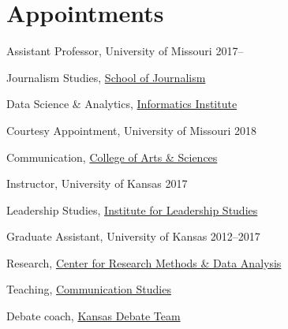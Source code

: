 
\section{Appointments}

Assistant Professor, University of Missouri                    \hfill 2017--

  \begin{outerlist}
    \item[] Journalism Studies, \href{http://journalism.missouri.edu/}{School of Journalism}
    \item[] Data Science \& Analytics, \href{https://muii.missouri.edu/}{Informatics Institute}
  \end{outerlist}\vspace{.2in}

Courtesy Appointment, University of Missouri                   \hfill 2018

  \begin{outerlist}
    \item[] Communication, \href{https://communication.missouri.edu/}{College of Arts \& Sciences}
  \end{outerlist}\vspace{.2in}


Instructor, University of Kansas                               \hfill 2017

  \begin{outerlist}
    \item[] Leadership Studies, \href{https://ils.ku.edu/about/}{Institute for Leadership Studies}
  \end{outerlist}\vspace{.2in}

Graduate Assistant, University of Kansas                       \hfill 2012--2017

  \begin{outerlist}
    \item[] Research, \href{http://www.crmda.ku.edu/}{Center for Research Methods \& Data Analysis}
    \item[] Teaching, \href{http://www.coms.ku.edu/}{Communication Studies}
    \item[] Debate coach, \href{http://www.debate.ku.edu/}{Kansas Debate Team}
  \end{outerlist}
